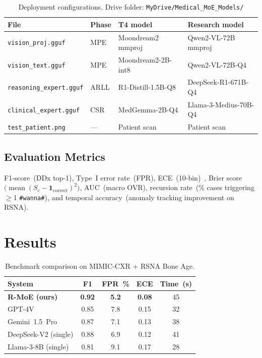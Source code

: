 \documentclass[10pt,twocolumn]{article}
\newcommand{\rowhead}{\rowcolor{RMoENavy!12}}
\newcommand{\rowalt}{\rowcolor{RMoELightBlue}}
\newcommand{\rowbest}{\rowcolor{RMoELightGold}}
\begin{document}
\begin{table}[h]
  \centering
  \small
  \setlength{\tabcolsep}{4pt}
  \caption{Deployment configurations. Drive folder:
           \texttt{MyDrive/Medical\_MoE\_Models/}}
  \label{tab:deploy}
  \begin{tabular}{@{}lllp{2cm}@{}}
    \toprule
    \rowhead
    \textbf{File} & \textbf{Phase} &
    \textbf{T4 model} & \textbf{Research model} \\
    \midrule
    \rowalt \texttt{vision\_proj.gguf}      & MPE  &
            Moondream2 mmproj & Qwen2-VL-72B mmproj \\
            \texttt{vision\_text.gguf}      & MPE  &
            Moondream2-2B-int8 & Qwen2-VL-72B-Q4 \\
    \rowalt \texttt{reasoning\_expert.gguf} & ARLL &
            R1-Distill-1.5B-Q8 & DeepSeek-R1-671B-Q4 \\
            \texttt{clinical\_expert.gguf}  & CSR  &
            MedGemma-2B-Q4 & Llama-3-Medius-70B-Q4 \\
    \rowalt \texttt{test\_patient.png}      & —    &
            Patient scan & Patient scan \\
    \bottomrule
  \end{tabular}
\end{table}

\subsection{Evaluation Metrics}

F1-score~(DDx top-1), Type~I error rate~(FPR), ECE~(10-bin)~\cite{guo2017calibration},
Brier score $\bigl(\operatorname{mean}(S_c - \mathbf{1}_{\mathrm{correct}})^2\bigr)$,
AUC~(macro OVR), recursion rate~(\% cases triggering $\ge$1 \texttt{\#wanna\#}),
and temporal accuracy~(anomaly tracking improvement on RSNA).

\section{Results}
\label{sec:results}

\begin{table}[h]
  \centering
  \small
  \caption{Benchmark comparison on MIMIC-CXR + RSNA Bone Age.}
  \label{tab:results}
  \begin{tabular}{@{}lcccc@{}}
    \toprule
    \rowhead
    \textbf{System} & \textbf{F1} & \textbf{FPR~\%} &
    \textbf{ECE} & \textbf{Time~(s)} \\
    \midrule
    \rowbest
    \textbf{R-MoE (ours)} & \textbf{0.92} & \textbf{5.2} &
    \textbf{0.08} & 45 \\
    \rowalt GPT-4V              & 0.85 & 7.8 & 0.15 & 32 \\
            Gemini~1.5~Pro      & 0.87 & 7.1 & 0.13 & 38 \\
    \rowalt DeepSeek-V2 (single)& 0.88 & 6.9 & 0.12 & 41 \\
            Llama-3-8B (single) & 0.81 & 9.1 & 0.17 & 28 \\
    \bottomrule
  \end{tabular}
\end{table}
\end{document}
